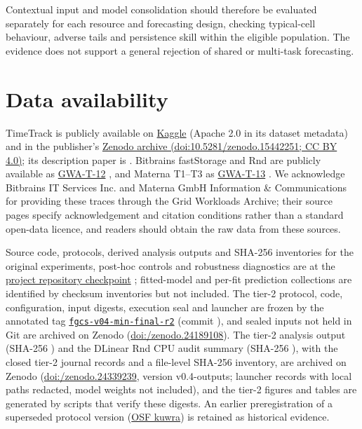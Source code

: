 \documentclass[5p,twocolumn]{elsarticle}
\begin{document}
Contextual input and model consolidation should therefore be evaluated
separately for each resource and forecasting design, checking typical-cell
behaviour, adverse tails and persistence skill within the eligible
population. The evidence does not support a general rejection of shared or
multi-task forecasting.

\section*{Data availability}

TimeTrack is publicly available on
\href{https://www.kaggle.com/datasets/abdelghanimeliani/open-air-interface-cicd-timeseries-dataset}{Kaggle}
(Apache 2.0 in its dataset metadata) and in the publisher's
\href{https://doi.org/10.5281/zenodo.15442251}{Zenodo archive
(doi:10.5281/zenodo.15442251; CC BY 4.0)}; its description paper is
\citet{Meliani2025TimeTrack}. Bitbrains fastStorage and Rnd are publicly
available as \href{https://atlarge-research.com/gwa-t-12/}{GWA-T-12}
\citep{Shen2015Bitbrains}, and Materna T1--T3 as
\href{https://atlarge-research.com/gwa-t-13/}{GWA-T-13}
\citep{Kohne2014FederatedCloudSim,Kohne2016SLAScheduling}. We acknowledge
Bitbrains IT Services Inc. and Materna GmbH Information \& Communications for
providing these traces through the Grid Workloads Archive; their source pages
specify acknowledgement and citation conditions rather than a standard
open-data licence, and readers should obtain the raw data from these sources.

Source code, protocols, derived analysis outputs and SHA-256 inventories for
the original experiments, post-hoc controls and robustness diagnostics are at
the
\href{https://github.com/KADOUMAAbdelhak/TimeTrack-Forecasting-Framework/tree/0e8cad884896a706f62f0fae4ab2b52812f9b033}{project repository checkpoint}
\texttt{}; fitted-model and
per-fit prediction collections are identified by checksum inventories but not
included. The tier-2 protocol, code, configuration, input digests, execution
seal and launcher are frozen by the annotated tag
\href{https://github.com/KADOUMAAbdelhak/TimeTrack-Forecasting-Framework/tree/fgcs-v04-min-final-r2}{\texttt{fgcs-v04-min-final-r2}}
(commit \texttt{}), and
sealed inputs not held in Git are archived on Zenodo
(\href{https://doi.org/10.5281/zenodo.24189108}{doi:/\allowbreak zenodo.24189108}).
The tier-2 analysis output (SHA-256
\texttt{})
and the DLinear Rnd CPU audit summary (SHA-256
\texttt{}),
with the closed tier-2 journal records and a file-level SHA-256 inventory, are
archived on Zenodo
(\href{https://doi.org/10.5281/zenodo.24339239}{doi:/\allowbreak zenodo.24339239},
version v0.4-outputs; launcher records with local paths redacted, model
weights not included), and the tier-2 figures and tables are generated by
scripts that verify these digests. An earlier preregistration of a superseded
protocol version (\href{https://osf.io/kuwra}{OSF kuwra}) is retained as
historical evidence.
\end{document}
